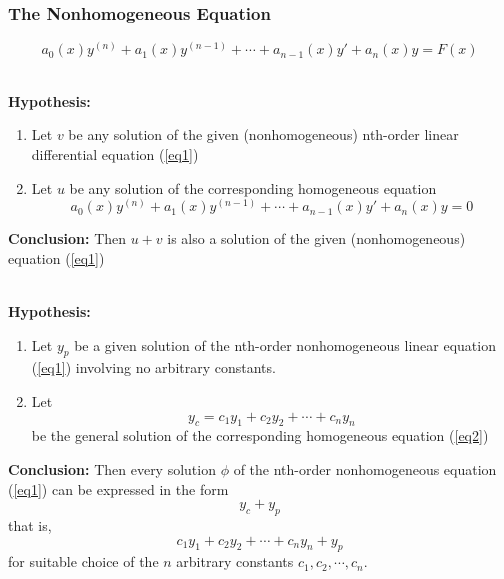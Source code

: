 \vspace{20pt}
\subsubsection{The Nonhomogeneous Equation}
\begin{equation}\tag{3.1.1}
    a_0(x)y^{(n)} + a_1(x)y^{(n-1)} + \cdots + a_{n-1}(x)y' + a_n(x)y = F(x)
\end{equation}

\begin{theorem}{}{}
    \\\textbf{Hypothesis:}
    \begin{enumerate}
        \item Let $v$ be any solution of the given (nonhomogeneous) nth-order linear differential equation (\ref{eq1})
        \item Let $u$ be any solution of the corresponding homogeneous equation
            \begin{equation} \tag{3.1.2}
                a_0(x)y^{(n)} + a_1(x)y^{(n-1)} + \cdots + a_{n-1}(x)y' + a_n(x)y = 0
            \end{equation}
    \end{enumerate}
    \textbf{Conclusion:} Then $u + v$ is also a solution of the given (nonhomogeneous) equation (\ref{eq1})
\end{theorem}

\begin{theorem}{}{}
    \\\textbf{Hypothesis:}
    \begin{enumerate}
        \item Let $y_p$ be a given solution of the nth-order nonhomogeneous linear equation (\ref{eq1}) involving no arbitrary constants.
        \item Let \[
            y_c = c_1y_1 + c_2y_2 + \cdots + c_ny_n
        \] be the general solution of the corresponding homogeneous equation (\ref{eq2})
    \end{enumerate}
    \textbf{Conclusion:} Then every solution $\phi$ of the nth-order nonhomogeneous equation (\ref{eq1}) can be expressed in the form \[
        y_c + y_p
    \] that is, \[
        c_1y_1 + c_2y_2 + \cdots + c_ny_n + y_p
    \] for suitable choice of the $n$ arbitrary constants $c_1, c_2, \cdots, c_n$.
\end{theorem}


